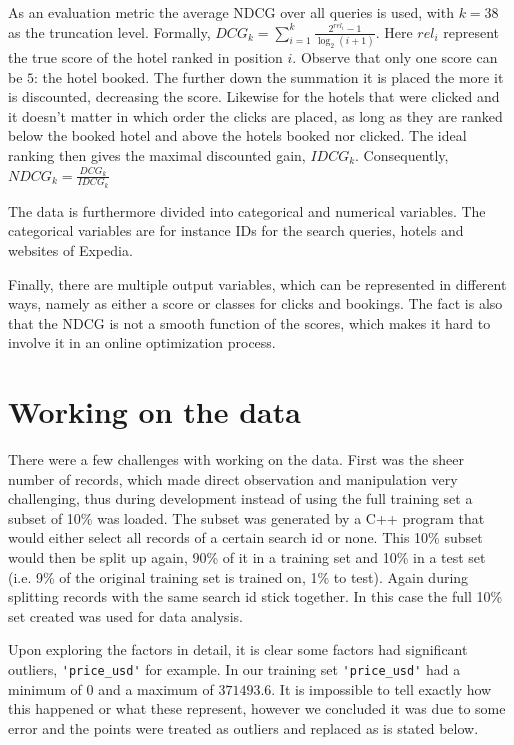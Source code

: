 \documentclass{llncs}
\begin{document}
As an evaluation metric the average NDCG over all queries is used, with $k=38$ as the truncation level. Formally, $\displaystyle DCG_{k}=\sum_{i=1}^{k}\frac{2^{rel_i}-1}{\log_{2}(i+1)}$. Here $rel_{i}$ represent the true score of the hotel ranked in position $i$. Observe that only one score can be $5$: the hotel booked. The further down the summation it is placed the more it is discounted, decreasing the score. Likewise for the hotels that were clicked and it doesn't matter in which order the clicks are placed, as long as they are ranked below the booked hotel and above the hotels booked nor clicked. The ideal ranking then gives the maximal discounted gain, $IDCG_{k}$. Consequently, $NDCG_{k}=\frac{DCG_{k}}{IDCG_{k}}$ 

The data is furthermore divided into categorical and numerical variables. The categorical variables are for instance IDs for the search queries, hotels and websites of Expedia.  

Finally, there are multiple output variables, which can be represented in different ways, namely as either a score or classes for clicks and bookings. The fact is also that the NDCG is not a smooth function of the scores, which makes it hard to involve it in an online optimization process.

\section{Working on the data}
\label{sec:working_on_data}

	There were a few challenges with working on the data. First was the sheer number of records, which made direct observation and manipulation very challenging, thus during development instead of using the full training set a subset of 10\% was loaded. The subset was generated by a C++ program that would either select all records of a certain search id or none. This 10\% subset would then be split up again, 90\% of it in a training set and 10\% in a test set (i.e. 9\% of the original training set is trained on, 1\% to test). Again during splitting records with the same search id stick together. In this case the full 10\% set created was used for data analysis.
	
	Upon exploring the factors in detail, it is clear some factors had significant outliers, \verb!'price_usd'! for example. In our training set \verb!'price_usd'! had a minimum of $0$ and a maximum of $371493.6$. It is impossible to tell exactly how this happened or what these represent, however we concluded it was due to some error and the points were treated as outliers and replaced as is stated below. 
\end{document}
